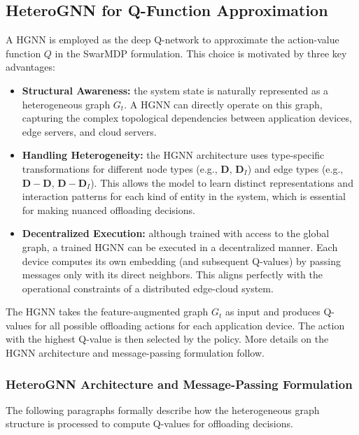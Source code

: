 \subsection{HeteroGNN for Q-Function Approximation}\label{sec:heterognn-q-function}
A \gls{HGNN} is employed as the deep Q-network to approximate the action-value function $Q$ in the SwarMDP formulation. 
%
This choice is motivated by three key advantages:
\begin{itemize}
    \item \textbf{Structural Awareness:} the system state is naturally represented as a heterogeneous graph $G_t$. 
    A \gls{HGNN} can directly operate on this graph, 
    capturing the complex topological dependencies between application devices, 
    edge servers, and cloud servers.
    \item \textbf{Handling Heterogeneity:} the \gls{HGNN} architecture uses type-specific transformations for different node types 
    (e.g., $\mathbf{D}$, $\mathbf{D}_I$) and edge types (e.g., $\mathbf{D}-\mathbf{D}$, $\mathbf{D}-\mathbf{D}_I$). 
    This allows the model to learn distinct representations and interaction patterns for each kind of entity in the system, 
    which is essential for making nuanced offloading decisions.
    \item \textbf{Decentralized Execution:} 
    although trained with access to the global graph, a trained \gls{HGNN} can be executed in a decentralized manner. 
    Each device computes its own embedding (and subsequent Q-values) 
    by passing messages only with its direct neighbors. 
    This aligns perfectly with the operational constraints of a distributed edge-cloud system.
\end{itemize}
The \gls{HGNN} takes the feature-augmented graph $G_t$ as input 
 and produces Q-values for all possible offloading actions for each application device. 
%
The action with the highest Q-value is then selected by the policy.
%
More details on the \gls{HGNN} architecture and message-passing formulation follow.

\subsubsection{HeteroGNN Architecture and Message-Passing Formulation}
The following paragraphs formally describe how the heterogeneous graph structure 
 is processed to compute Q-values for offloading decisions.

